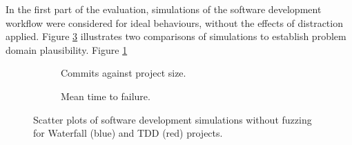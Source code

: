 \documentclass{llncs}
\begin{document}



In the first part of the evaluation, simulations of the software development workflow were considered for ideal
behaviours, without the effects of distraction applied.  Figure \ref{fig:no-fuzzing} illustrates two comparisons of
simulations to establish problem domain plausibility.  Figure \ref{fig:no-fuzzing:features}%
\begin{figure}[t]
  \centering

  \hfill
  \begin{subfigure}{2.3in}
    \caption{Commits against project size.}
    \label{fig:no-fuzzing:features}
  \end{subfigure}
  \hfill
  \begin{subfigure}{2.3in}
    \caption{Mean time to failure.}  
    \label{fig:no-fuzzing:mtf}
  \end{subfigure}
  \hfill

  \caption{Scatter plots of software development simulations without fuzzing for Waterfall (blue) and TDD (red)
    projects.}
  \label{fig:no-fuzzing}
\end{figure}
\end{document}
